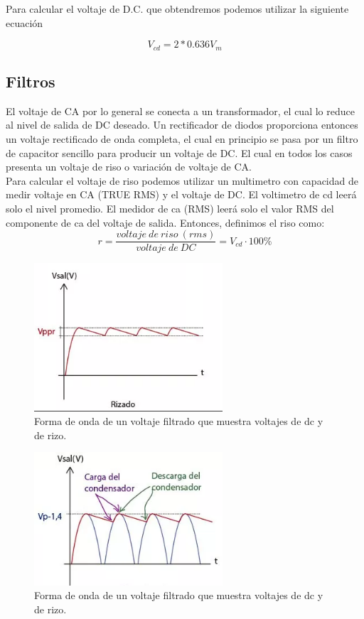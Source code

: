 Para calcular el voltaje de D.C. que obtendremos podemos utilizar la siguiente ecuación\cite{rectificador}


\begin{equation}\label{eq:ej}
V_{cd}=2*0.636V_{m}
\end{equation}

\newpage
\subsection{Filtros}
El voltaje de CA por lo general se conecta a un transformador, el cual lo reduce al nivel de salida de DC deseado. Un rectificador de diodos proporciona entonces un voltaje rectificado de onda completa, el cual en principio se pasa por un filtro de capacitor sencillo para producir un voltaje de DC. El cual en todos los casos presenta un voltaje de riso o variación de voltaje de CA.\\

Para calcular el voltaje de riso podemos utilizar un multimetro con capacidad de medir voltaje en CA (TRUE RMS) y el voltaje de DC. El voltimetro de cd leerá solo el nivel promedio. El medidor de ca (RMS) leerá solo el valor RMS del componente de ca del voltaje de salida. Entonces, definimos el riso como:\\

\begin{equation}
r=\frac{voltaje\:  de\:  riso\:  (rms)}{voltaje\:  de\:  DC}=V_{cd}\cdot 100\%
\end{equation}

\begin{figure}[H]
\centering
\includegraphics[width=7cm]{capitulo3/figs/risado.png}
\caption{ Forma de onda de un voltaje filtrado que muestra voltajes de dc y de rizo.}
\end{figure}

\begin{figure}[H]
\centering
\includegraphics[width=7cm]{capitulo3/figs/filtro.png}
\caption{ Forma de onda de un voltaje filtrado que muestra voltajes de dc y de rizo.}
\end{figure}

